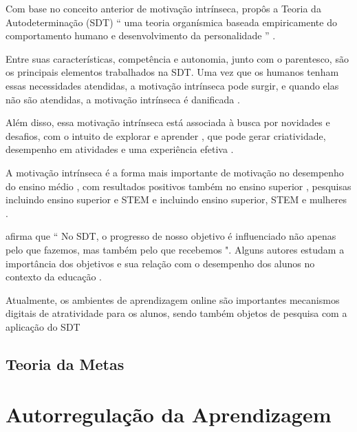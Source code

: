 Com base no conceito anterior de motivação intrínseca, \citet{ryan_self-determination_2017} propôs a Teoria da Autodeterminação (SDT) `` uma teoria organísmica baseada empiricamente do comportamento humano e desenvolvimento da personalidade '' \citep{ryan_self-determination_2017}.

Entre suas características, competência e autonomia, junto com o parentesco, são os principais elementos trabalhados na SDT. Uma vez que os humanos tenham essas necessidades atendidas, a motivação intrínseca pode surgir, e quando elas não são atendidas, a motivação intrínseca é danificada \citet{ryan_self-determination_2017}.

Além disso, essa motivação intrínseca está associada à busca por novidades e desafios, com o intuito de explorar e aprender \citep{ryan_self-determination_2000}, que pode gerar criatividade, desempenho em atividades e uma experiência efetiva \citep{di_domenico_emerging_2017}.

A motivação intrínseca é a forma mais importante de motivação no desempenho do ensino médio  \citep{taylor_self-determination_2014,froiland_intrinsic_2016}, com resultados positivos também no ensino superior  \citep{williams_importance_1998, muller_continuity_2005}, pesquisas incluindo ensino superior e STEM \citep{de_loof_teachers_2019, wang_multilevel_2020} e incluindo ensino superior, STEM e mulheres \citep{moore_connecting_2020, skewes_absent_2018}.

\citep{chua_association_2021} afirma que `` No SDT, o progresso de nosso objetivo é influenciado não apenas pelo que fazemos, mas também pelo que recebemos ". Alguns autores estudam a importância dos objetivos e sua relação com o desempenho dos alunos no contexto da educação \citet{chua_association_2021, benita_emotion_2021, benita_important_2017, benita_when_2014}.

Atualmente, os ambientes de aprendizagem online são importantes mecanismos digitais de atratividade para os alunos, sendo também objetos de pesquisa com a aplicação do SDT \citet{chiu_applying_2021, chiu_digital_2021, chen_motivation_2010}

\subsection{Teoria da Metas}

\section{Autorregulação da Aprendizagem}

